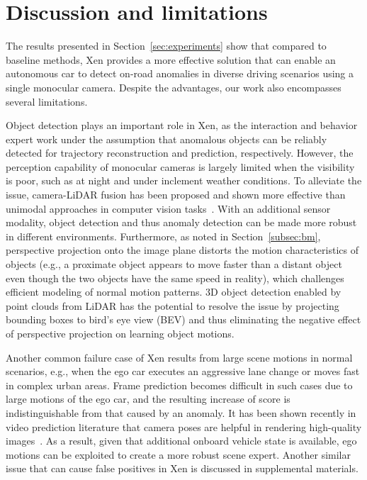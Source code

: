 \section{Discussion and limitations}
The results presented in Section~\ref{sec:experiments} show that compared to baseline methods, Xen provides a more effective solution that can enable an autonomous car to detect on-road anomalies in diverse driving scenarios using a single monocular camera. Despite the advantages, our work also encompasses several limitations.

Object detection plays an important role in Xen, as the interaction and behavior expert work under the assumption that anomalous objects can be reliably detected for trajectory reconstruction and prediction, respectively. However, the perception capability of monocular cameras is largely limited when the visibility is poor, such as at night and under inclement weather conditions. To alleviate the issue, camera-LiDAR fusion has been proposed and shown more effective than unimodal approaches in computer vision tasks~\citep{cui2021deep,chen2017multi,sindagi2019mvx}. With an additional sensor modality, object detection and thus anomaly detection can be made more robust in different environments. Furthermore, as noted in Section~\ref{subsec:bm}, perspective projection onto the image plane distorts the motion characteristics of objects (e.g., a proximate object appears to move faster than a distant object even though the two objects have the same speed in reality), which challenges efficient modeling of normal motion patterns. 3D object detection enabled by point clouds from LiDAR has the potential to resolve the issue by projecting bounding boxes to bird's eye view (BEV) and thus eliminating the negative effect of perspective projection on learning object motions.

Another common failure case of Xen results from large scene motions in normal scenarios, e.g., when the ego car executes an aggressive lane change or moves fast in complex urban areas. Frame prediction becomes difficult in such cases due to large motions of the ego car, and the resulting increase of score is indistinguishable from that caused by an anomaly. It has been shown recently in video prediction literature that camera poses are helpful in rendering high-quality images~\citep{ak2021robust}. As a result, given that additional onboard vehicle state is available, ego motions can be exploited to create a more robust scene expert. Another similar issue that can cause false positives in Xen is discussed in supplemental materials.

